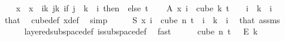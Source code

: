 \begin{isabellebody}
%
\isadelimproof
%
\endisadelimproof
%
\isatagproof
{}\isamarkupfalse%
{\isacharminus}{\kern0pt}\isanewline
\ \ \isamarkupfalse%
\ x\ \ {\isachardoublequoteopen}x\ {\isasymequiv}\ {\isacharparenleft}{\kern0pt}{\isasymlambda}i{\isasymin}{\isacharbraceleft}{\kern0pt}{\isachardot}{\kern0pt}{\isachardot}{\kern0pt}k{\isacharbraceright}{\kern0pt}{\isachardot}{\kern0pt}\ {\isasymlambda}j{\isasymin}{\isacharbraceleft}{\kern0pt}{\isachardot}{\kern0pt}{\isachardot}{\kern0pt}{\isacharless}{\kern0pt}k{\isacharbraceright}{\kern0pt}{\isachardot}{\kern0pt}\ {\isacharparenleft}{\kern0pt}if\ j\ {\isacharless}{\kern0pt}\ k\ {\isacharminus}{\kern0pt}\ i\ then\ {}\ else\ t{\isacharparenright}{\kern0pt}{\isacharparenright}{\kern0pt}{\isachardoublequoteclose}\isanewline
\isanewline
\ \ \isamarkupfalse%
\ A{\isacharcolon}{\kern0pt}\ {\isachardoublequoteopen}x\ i\ {\isasymin}\ cube\ k\ {\isacharparenleft}{\kern0pt}t\ {\isacharplus}{\kern0pt}\ {}{\isacharparenright}{\kern0pt}{\isachardoublequoteclose}\ \ {\isachardoublequoteopen}i\ {\isasymle}\ k{\isachardoublequoteclose}\ \ i\ \isamarkupfalse%
\ that\ \isamarkupfalse%
\ cube{\isacharunderscore}{\kern0pt}def\ x{\isacharunderscore}{\kern0pt}def\ \isamarkupfalse%
\ simp\isanewline
\ \ \isamarkupfalse%
\ \isamarkupfalse%
\ {\isachardoublequoteopen}S\ {\isacharparenleft}{\kern0pt}x\ i{\isacharparenright}{\kern0pt}\ {\isasymin}\ cube\ n\ {\isacharparenleft}{\kern0pt}t{\isacharplus}{\kern0pt}{}{\isacharparenright}{\kern0pt}{\isachardoublequoteclose}\ \ {\isachardoublequoteopen}i\ {\isasymle}\ k{\isachardoublequoteclose}\ \ i\ \isamarkupfalse%
\ that\ assms{\isacharparenleft}{\kern0pt}{}{\isacharparenright}{\kern0pt}\ \isanewline
\ \ \ \ \isamarkupfalse%
\ layered{\isacharunderscore}{\kern0pt}subspace{\isacharunderscore}{\kern0pt}def\ is{\isacharunderscore}{\kern0pt}subspace{\isacharunderscore}{\kern0pt}def\ \isamarkupfalse%
\ fast\isanewline
\isanewline
\ \ \isamarkupfalse%
\ {\isachardoublequoteopen}{\isasymchi}\ {\isasymin}\ cube\ n\ {\isacharparenleft}{\kern0pt}t\ {\isacharplus}{\kern0pt}\ {}{\isacharparenright}{\kern0pt}\ {\isasymrightarrow}\isactrlsub E\ {\isacharbraceleft}{\kern0pt}{\isachardot}{\kern0pt}{\isachardot}{\kern0pt}{\isacharless}{\kern0pt}k{\isacharbraceright}{\kern0pt}{\isachardoublequoteclose}\ \isamarkupfalse%

\end{isabellebody}
